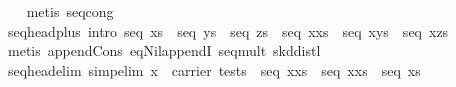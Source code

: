 \begin{isabellebody}
%
\isadelimproof
\ \ %
\endisadelimproof
%
\isatagproof
{}\isamarkupfalse%
\ {}metis\ seq{}cong{}%
\endisatagproof
{\isafoldproof}%
%
\isadelimproof
\isanewline
%
\endisadelimproof
\isanewline
{}\isamarkupfalse%
\ seq{}head{}plus\ {}intro{}{}\ {}seq\ xs\ {}\ seq\ ys\ {}\ seq\ zs\ {}\ seq\ {}x{}xs{}\ {}\ seq\ {}x{}ys{}\ {}\ seq\ {}x{}zs{}{}\isanewline
%
\isadelimproof
\ \ %
\endisadelimproof
%
\isatagproof
{}\isamarkupfalse%
\ {}metis\ append{}Cons\ eq{}Nil{}appendI\ seq{}mult\ skd{}distl{}%
\endisatagproof
{\isafoldproof}%
%
\isadelimproof
\isanewline
%
\endisadelimproof
\isanewline
{}\isamarkupfalse%
\ seq{}head{}elim\ {}simp{}elim{}{}\ {}x\ {}\ carrier\ tests\ {}\ seq\ {}x{}xs{}\ {}\ seq\ {}{}x{}xs{}\ {}\ seq\ xs{}\isanewline
%
\isadelimproof
%
\endisadelimproof
%
\isatagproof
{}\isamarkupfalse%

\end{isabellebody}
